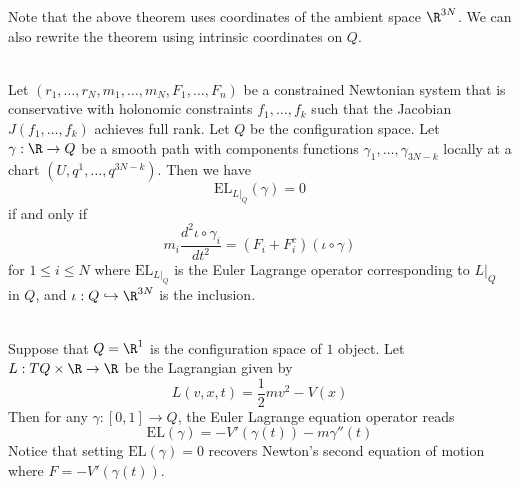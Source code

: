 \documentclass[a4paper]{article}
\begin{document}
Note that the above theorem uses coordinates of the ambient space $\R^{3N}$. We can also rewrite the theorem using intrinsic coordinates on $Q$. 

\begin{thm}{}{}\\
Let $(r_1,\dots,r_N,m_1,\dots,m_N,F_1,\dots,F_n)$ be a constrained Newtonian system that is conservative with holonomic constraints $f_1,\dots,f_k$ such that the Jacobian $J(f_1,\dots,f_k)$ achieves full rank. Let $Q$ be the configuration space. Let $\gamma:\R\to Q$ be a smooth path with components functions $\gamma_1,\dots,\gamma_{3N-k}$ locally at a chart $(U,q^1,\dots,q^{3N-k})$. Then we have $$\text{EL}_{L|_Q}(\gamma)=0$$ if and only if $$m_i\frac{d^2\iota\circ\gamma_i}{dt^2}=(F_i+F_i^c)(\iota\circ\gamma)$$ for $1\leq i\leq N$ where $\text{EL}_{L|_Q}$ is the Euler Lagrange operator corresponding to $L|_Q$ in $Q$, and $\iota:Q\hookrightarrow\R^{3N}$ is the inclusion. 
\end{thm}

\begin{eg}{}{}\\
Suppose that $Q=\R^1$ is the configuration space of $1$ object. Let $L:TQ\times\R\to\R$ be the Lagrangian given by $$L(v,x,t)=\frac{1}{2}mv^2-V(x)$$ Then for any $\gamma:[0,1]\to Q$, the Euler Lagrange equation operator reads $$\text{EL}(\gamma)=-V'(\gamma(t))-m\gamma''(t)$$ Notice that setting $\text{EL}(\gamma)=0$ recovers Newton's second equation of motion where $F=-V'(\gamma(t))$. 
\end{eg}
\end{document}
